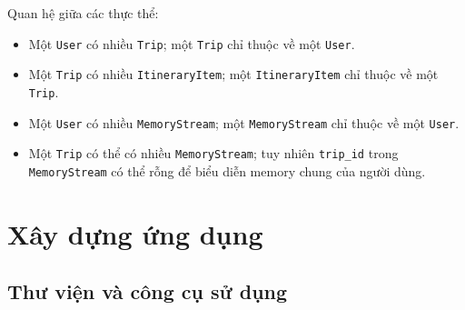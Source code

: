 \documentclass[../DoAn.tex]{subfiles}
\begin{document}
Quan hệ giữa các thực thể:

\begin{itemize}
    \item Một \texttt{User} có nhiều \texttt{Trip}; một \texttt{Trip} chỉ thuộc về một \texttt{User}.
    \item Một \texttt{Trip} có nhiều \texttt{ItineraryItem}; một \texttt{ItineraryItem} chỉ thuộc về một \texttt{Trip}.
    \item Một \texttt{User} có nhiều \texttt{MemoryStream}; một \texttt{MemoryStream} chỉ thuộc về một \texttt{User}.
    \item Một \texttt{Trip} có thể có nhiều \texttt{MemoryStream}; tuy nhiên \texttt{trip\_id} trong \texttt{MemoryStream} có thể rỗng để biểu diễn memory chung của người dùng.
\end{itemize}

\section{Xây dựng ứng dụng}

\subsection{Thư viện và công cụ sử dụng}
\end{document}
